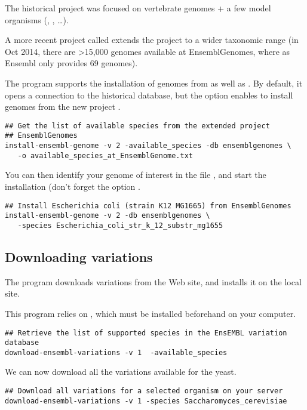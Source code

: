 The historical \ensembl project 
was focused on vertebrate genomes + a few model organisms
(, ,
\ldots).

A more recent project called \ensemblgenomes
{} extends the \ensembl project to a
wider taxonomic range (in Oct 2014, there are >15,000 genomes
available at EnsemblGenomes, where as Ensembl only provides 69
genomes).

The program  supports the installation
of genomes from \ensembl as well as \ensemblgenomes. By default, it
opens a connection to the historical \ensembl database, but the option
 enables to install genomes from the new
project \ensemblgenomes.

\begin{lstlisting}
## Get the list of available species from the extended project
## EnsemblGenomes
install-ensembl-genome -v 2 -available_species -db ensemblgenomes \
   -o available_species_at_EnsemblGenome.txt
\end{lstlisting}

You can then identify your genome of interest in the file
, and start the
installation (don't forget the option .

\begin{lstlisting}
## Install Escherichia coli (strain K12 MG1665) from EnsemblGenomes
install-ensembl-genome -v 2 -db ensemblgenomes \
   -species Escherichia_coli_str_k_12_substr_mg1655
\end{lstlisting}


\subsection{Downloading variations}
\label{sect:download_ensembl_variations}

The program  downloads variations
from the \ensembl Web site, and installs it on the local \RSAT
site. 

This program relies on , which must be installed
beforehand on your computer.

\begin{lstlisting}
## Retrieve the list of supported species in the EnsEMBL variation database
download-ensembl-variations -v 1  -available_species
\end{lstlisting}

We can now download all the variations available for the yeast.

\begin{lstlisting}
## Download all variations for a selected organism on your server
download-ensembl-variations -v 1 -species Saccharomyces_cerevisiae
\end{lstlisting}

